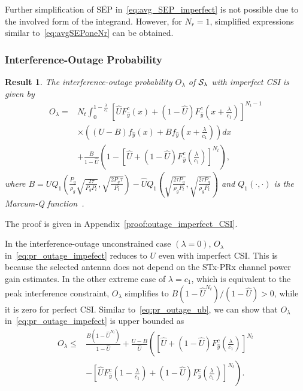 \documentclass[journal]{IEEEtran}
\newtheorem{result}{{\bf Result}}
\newcommand{\SEP}{\text{SEP}}
\newcommand{\lam}{\lambda}
\newcommand{\Nt}{{N_t}}
\newcommand{\Nr}{{N_r}}
\newcommand{\Pt}{{P_t}}
\newcommand{\itau}{\tau}
\newcommand{\cone}{c_{1}}
\newcommand{\out}{O}
\newcommand{\lambycone}{\frac{\lam}{\cone}}
\newcommand{\un}{U}
\newcommand{\callamrule}{{\cal S_{{\lam}}}}
\newcommand{\outlam}{\out_{\lam}}
\newcommand{\avgSEP}{\overline{\SEP}}
\newcommand{\unhat}{\widehat{\un}}
\newcommand{\gpilotpower}{P_g}
\newcommand{\yhat}{\hat{y}}
\newcommand{\Probglt}{B}
\newcommand{\rhog}{\rho_g}
\begin{document}
Further simplification of $\avgSEP$ in~\eqref{eq:avg_SEP_imperfect} is not possible due to the involved form of the integrand. However, for $\Nr=1$, simplified expressions similar to~\eqref{eq:avgSEPoneNr} can be obtained. 



\subsubsection{Interference-Outage Probability} 
%
\begin{result}
\label{thm:outage_imperfect_CSI}
  The interference-outage probability $\outlam$ of $\callamrule$ with imperfect CSI is given by
\begin{align}
\label{eq:pr_outage_impefect} 
\!\outlam \!=& \Nt \!\int_{0}^{1-\lambycone} 	
\!\left[ \unhat F_{\yhat}^{c}\left(x\right) + \left(1 -\unhat\right)F_{\yhat}^{c}\left(x+\lambycone\right)\right]^{\Nt-1}\nonumber\\
&\times \left( (\un - \Probglt) f_{\yhat}\left(x\right)  +  \Probglt f_{\yhat}\left( x+\lambycone\right) \right) dx\nonumber\\
&+ \frac{ \Probglt}{1 - \unhat} \left( 1 - \left[\unhat + \left(1 -\unhat\right)F_{\yhat}^{c}\left(\lambycone\right)  \right]^{\Nt}  \right),
\end{align}
%
where 
$\Probglt \!=\! \un  Q_1\!\!\left(\!\frac{\gpilotpower}{\rhog } \sqrt{\frac{2\itau}{ \gpilotpower\Pt}},\sqrt{\frac{2 \gpilotpower\itau}{\Pt}}\!\right) \! - \unhat  Q_1\!\left(\!\sqrt{\frac{2\itau \gpilotpower}{\rhog \Pt}},\!\sqrt{\frac{2\itau\gpilotpower}{\rhog \Pt}} \!\right)\!$ and  $Q_1(\cdot,\cdot)$ is the Marcum-Q function~\cite[eq. (4.34)]{simon_alouini_book}. 
\end{result}
%
\begin{IEEEproof}
	The proof is given in Appendix~\ref{proof:outage_imperfect_CSI}.
\end{IEEEproof}
%

In the interference-outage unconstrained case $\left(\lam=0\right)$, $\outlam$ in~\eqref{eq:pr_outage_impefect} reduces to $\un$ even with imperfect CSI. This is because  the selected antenna does not depend on the  STx-PRx channel power gain estimates. In the other extreme case of $\lam = \cone$, which is equivalent to the peak interference constraint, $\outlam$ simplifies to ${\Probglt \left( 1-\unhat^{\Nt}\right)}/( {1-\unhat})>0 $, while it is zero for perfect CSI.  Similar to~\eqref{eq:pr_outage_ub}, 
we can show that $\outlam$ in~\eqref{eq:pr_outage_impefect}  is upper bounded as 
\begin{align}
\outlam  \leq  &\frac{ \Probglt \left( 1-\unhat^{\Nt}\right)}{1-\unhat} + \frac{\un - \Probglt}{\unhat}\!\!\left( \left[\unhat + \left(1-\unhat\right)F_{\yhat}^{c}\left(\lambycone\right)\right]^{\Nt} \right. \nonumber \\ &\left. - \left[ \unhat F_{\yhat}^{c}\left(1-\lambycone\right) + \left(1-\unhat\right)F_{\yhat}^{c}\left(\lambycone\right)\right]^{\Nt}\right).
\end{align}
\end{document}
